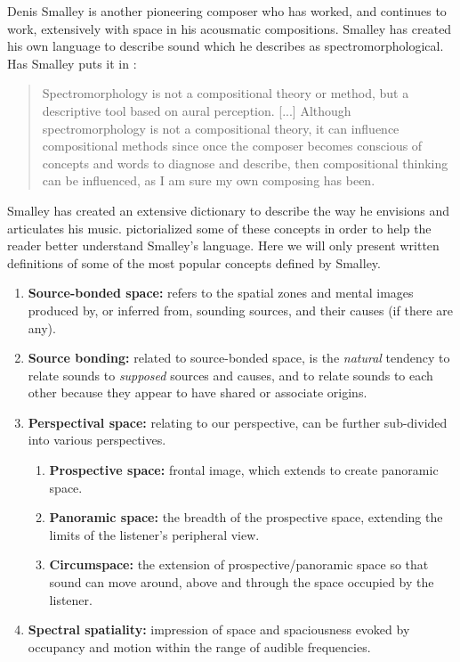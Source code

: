 Denis Smalley is another pioneering composer who has worked, and continues to work, extensively with space in his acousmatic compositions. Smalley has created his own language to describe sound which he describes as spectromorphological. Has Smalley puts it in \cite{smalley1997spectromorphology}:

\begin{quote}
    Spectromorphology is not a compositional theory or method, but a descriptive tool based on aural perception. [...] Although spectromorphology is not a compositional theory, it can influence compositional methods since once the composer becomes conscious of concepts and words to diagnose and describe, then compositional thinking can be influenced, as I am sure my own composing has been.
\end{quote}

Smalley has created an extensive dictionary to describe the way he envisions and articulates his music. \cite{blackburn2011visual} pictorialized some of these concepts in order to help the reader better understand Smalley's language. Here we will only present written definitions of some of the most popular concepts defined by Smalley. 

\begin{enumerate}
    \item \textbf{Source-bonded space:} refers to the spatial zones and mental images produced by, or inferred from, sounding sources, and their causes (if there are any). 
    \item \textbf{Source bonding:} related to source-bonded space, is the \textit{natural} tendency to relate sounds to \textit{supposed} sources and causes, and to relate sounds to each other because they appear to have shared or associate origins.
    \item \textbf{Perspectival space:}  relating to our perspective, can be further sub-divided into various perspectives.
    \begin{enumerate}
        \item \textbf{Prospective space:} frontal image, which extends to create panoramic space.
        \item \textbf{Panoramic space:} the breadth of the prospective space, extending the limits of the listener's peripheral view.
        \item \textbf{Circumspace:} the extension of prospective/panoramic space so that sound can move around, above and through the space occupied by the listener.
    \end{enumerate}
    \item \textbf{Spectral spatiality:} impression of space and spaciousness evoked by occupancy and motion within the range of audible frequencies.
\end{enumerate}


